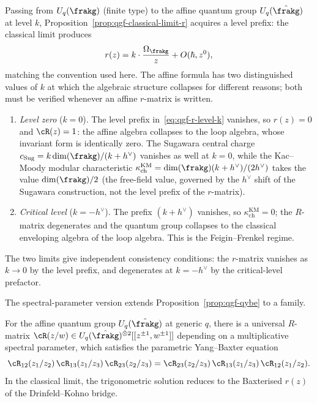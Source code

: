 \begin{remark}
\label{rem:qgf-level-stripped-r}
Passing from $U_q(\frakg)$ (finite type) to the affine quantum group $U_q(\hat{\frakg})$ at level $k$, Proposition~\ref{prop:qgf-classical-limit-r} acquires a level prefix: the classical limit produces
\begin{equation}
 r(z) = k \cdot \frac{\Omega_{\frakg}}{z} + O(\hbar, z^0),
 \label{eq:qgf-r-level-k}
\end{equation}
matching the convention used here. The affine formula has two distinguished values of $k$ at which the algebraic structure collapses for different reasons; both must be verified whenever an affine $r$-matrix is written.
\begin{enumerate}[label=(\alph*)]
 \item \emph{Level zero} ($k = 0$). The level prefix in~\eqref{eq:qgf-r-level-k} vanishes, so $r(z) = 0$ and $\cR(z) = 1$: the affine algebra collapses to the loop algebra, whose invariant form is identically zero. The Sugawara central charge $c_{\mathrm{Sug}} = k\dim(\frakg)/(k + h^\vee)$ vanishes as well at $k = 0$, while the Kac--Moody modular characteristic $\kappa_{\mathrm{ch}}^{\mathrm{KM}} = \dim(\frakg)(k + h^\vee)/(2 h^\vee)$ takes the value $\dim(\frakg)/2$ (the free-field value, governed by the $h^\vee$ shift of the Sugawara construction, not the level prefix of the $r$-matrix).
 \item \emph{Critical level} ($k = -h^\vee$). The prefix $(k + h^\vee)$ vanishes, so $\kappa_{\mathrm{ch}}^{\mathrm{KM}} = 0$; the $R$-matrix degenerates and the quantum group collapses to the classical enveloping algebra of the loop algebra. This is the Feigin--Frenkel regime.
\end{enumerate}
The two limits give independent consistency conditions: the $r$-matrix vanishes as $k \to 0$ by the level prefix, and degenerates at $k = -h^\vee$ by the critical-level prefactor.
\end{remark}

The spectral-parameter version extends Proposition~\ref{prop:qgf-qybe} to a family.

\begin{proposition}
\label{prop:qgf-parametric-ybe}
For the affine quantum group $U_q(\hat{\frakg})$ at generic $q$, there is a universal $R$-matrix $\cR(z/w) \in U_q(\hat{\frakg})^{\hat{\otimes} 2}[[z^{\pm 1}, w^{\pm 1}]]$ depending on a multiplicative spectral parameter, which satisfies the parametric Yang--Baxter equation
\begin{equation}
 \cR_{12}(z_1/z_2) \, \cR_{13}(z_1/z_3) \, \cR_{23}(z_2/z_3)
 = \cR_{23}(z_2/z_3) \, \cR_{13}(z_1/z_3) \, \cR_{12}(z_1/z_2).
 \label{eq:qgf-parametric-ybe}
\end{equation}
In the classical limit, the trigonometric solution reduces to the Baxterised $r(z)$ of the Drinfeld--Kohno bridge.
\end{proposition}

